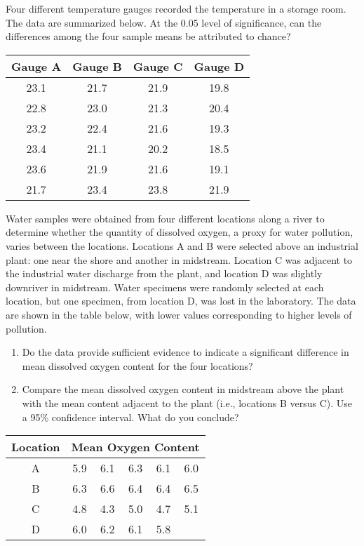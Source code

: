 \begin{problem}
Four different temperature gauges recorded the temperature in a storage room.  The data are summarized
below.  At the 0.05 level of significance, can the differences among the four sample means be attributed to chance?
\begin{table}[H]
\centering
\begin{tabular}{|c|c|c|c|} \hline
\bf{Gauge A} & \bf{Gauge B} & \bf{Gauge C} & \bf{Gauge D} \\ \hline
23.1	&	21.7	&	21.9	&	19.8 \\ \hline
22.8	&	23.0	&	21.3	&	20.4 \\ \hline
23.2	&	22.4	&	21.6	&	19.3 \\ \hline
23.4	&	21.1	&	20.2	&	18.5 \\ \hline
23.6	&	21.9	&	21.6	&	19.1 \\ \hline
21.7	&	23.4	&	23.8	&	21.9 \\ \hline
\end{tabular}
\end{table}
\end{problem}

\begin{problem}
	Water samples were obtained from four different locations along a river to determine
	whether the quantity of dissolved oxygen, a proxy for water pollution, varies between
	the locations.  Locations A and B were selected above an industrial plant: one near
	the shore and another in midstream. Location C was adjacent to the industrial water
	discharge from the plant, and location D was slightly downriver in midstream.
	Water specimens were randomly selected at each location, but one specimen, from location
	D, was lost in the laboratory.  The data are shown in the table below, with lower values
	corresponding to higher levels of pollution.
	\begin{enumerate}[label=\alph*)]
	\item Do the data provide sufficient evidence to indicate a significant difference in mean dissolved oxygen
	content for the four locations?
	\item Compare the mean dissolved oxygen content in midstream above the plant with the mean content
	adjacent to the plant (i.e., locations B versus C).  Use a 95\% confidence interval.  What do you conclude?
	\end{enumerate}
	\begin{table}[H]
	\centering
	\begin{tabular}{|c||c|c|c|c|c|} \hline
	\bf{Location} & \multicolumn{5}{c|}{\bf{Mean Oxygen Content}} \\ \hline
	A & 5.9 &  6.1 & 6.3  & 6.1 & 6.0 \\ \hline
	B & 6.3 &  6.6 & 6.4  & 6.4 & 6.5 \\ \hline
	C & 4.8 &  4.3 & 5.0  & 4.7 & 5.1 \\ \hline
	D & 6.0 &  6.2 & 6.1  & 5.8 &     \\ \hline
	\end{tabular}
	\end{table}
\end{problem}

